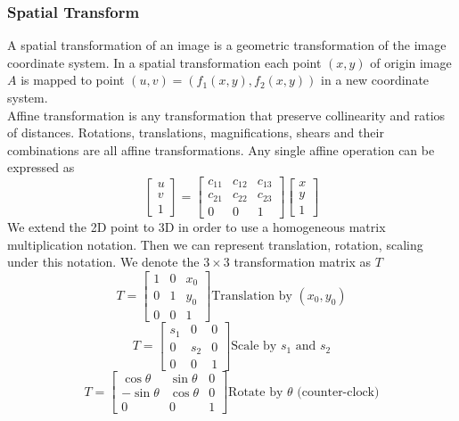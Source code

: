 \subsubsection{Spatial Transform}
A spatial transformation of an image is a geometric transformation of the image coordinate system. In a spatial transformation each point $(x,y)$ of origin image $A$ is mapped to point $(u,v)=(f_1(x,y), f_2(x,y))$ in a new coordinate system. \\
Affine transformation is any transformation that preserve collinearity and ratios of distances. Rotations, translations, magnifications, shears and their combinations are all affine transformations. Any single affine operation can be expressed as 
\begin{equation} \begin{bmatrix} u\\v\\1 \end{bmatrix} = 
\begin{bmatrix} c_{11} & c_{12} & c_{13} \\
c_{21} & c_{22} & c_{23} \\
0 & 0 & 1 \end{bmatrix} \begin{bmatrix}
x\\y\\1 \end{bmatrix} \end{equation}
We extend the 2D point to 3D in order to use a homogeneous matrix multiplication notation. Then we can represent translation, rotation, scaling under this notation. We denote the $3\times 3$ transformation matrix as $T$
\begin{equation} T= \begin{bmatrix} 1&0&x_0 \\ 0&1&y_0 \\ 0&0&1 \end{bmatrix} \text{Translation by }(x_0, y_0) \end{equation}
\begin{equation} T= \begin{bmatrix} s_1&0&0 \\ 0&s_2&0 \\ 0&0&1 \end{bmatrix} \text{Scale by $s_1$ and $s_2$} \end{equation}
\begin{equation} T= \begin{bmatrix} \cos \theta & \sin \theta & 0 \\ -\sin \theta & \cos \theta & 0 \\ 0&0&1 \end{bmatrix} \text{Rotate by $\theta$ (counter-clock)} \end{equation}
